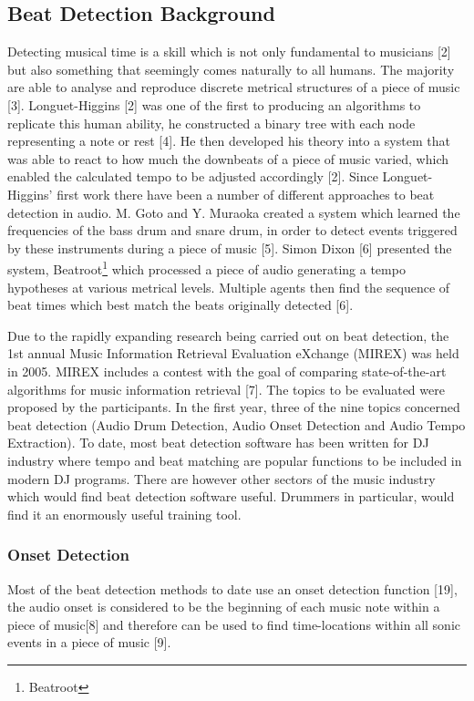 \documentclass[a4paper, 11pt]{article}
\begin{document}
\subsection{Beat Detection Background}

Detecting musical time is a skill which is not only fundamental to musicians [2] but also something that seemingly comes naturally to all humans. The majority are able to analyse and reproduce discrete metrical structures of a piece of music [3]. Longuet-Higgins [2] was one of the first to producing an algorithms to replicate this human ability, he constructed a binary tree with each node representing a note or rest [4]. He then developed his theory into a system that was able to react to how much the downbeats of a piece of music varied, which enabled the calculated tempo to be adjusted accordingly [2]. Since Longuet-Higgins' first work there have been a number of different approaches to beat detection in audio. M. Goto and Y. Muraoka created a system which learned the frequencies of the bass drum and snare drum, in order to detect events triggered by these instruments during a piece of music [5]. Simon Dixon [6] presented the system, Beatroot\footnote{Beatroot } which processed a piece of audio generating a tempo hypotheses at various metrical levels. Multiple agents then find the sequence of beat times which best match the beats originally detected [6].

Due to the rapidly expanding research being carried out on beat detection, the 1st annual Music Information Retrieval Evaluation eXchange (MIREX) was held in 2005. MIREX includes a contest with the goal of comparing state-of-the-art algorithms for music information retrieval [7]. The topics to be evaluated were proposed by the participants. In the first year, three of the nine topics concerned beat detection (Audio Drum Detection, Audio Onset Detection and Audio Tempo Extraction). To date, most beat detection software has been written for DJ industry where tempo and beat matching are popular functions to be included in modern DJ programs. There are however other sectors of the music industry which would find beat detection software useful. Drummers in particular, would find it an enormously useful training tool.

\subsubsection{Onset Detection}
Most of the beat detection methods to date use an onset detection function [19], the audio onset is considered to be the beginning of each music note within a piece of music[8] and therefore can be used to find time-locations within all sonic events in a piece of music [9]. 
\end{document}
